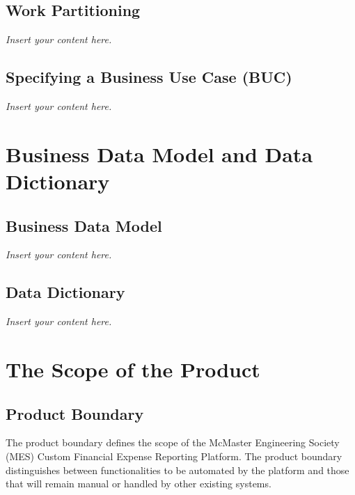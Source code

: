\documentclass[12pt]{article}
\newcommand{\lips}{\textit{Insert your content here.}}
\begin{document}
\subsection{Work Partitioning}
\lips
\subsection{Specifying a Business Use Case (BUC)}
\lips

\section{Business Data Model and Data Dictionary}
\subsection{Business Data Model}
\lips
\subsection{Data Dictionary}
\lips

\section{The Scope of the Product}

\subsection{Product Boundary}
The product boundary defines the scope of the McMaster Engineering Society (MES) Custom Financial Expense Reporting Platform. The product boundary distinguishes between functionalities to be automated by the platform and those that will remain manual or handled by other existing systems.
\end{document}
